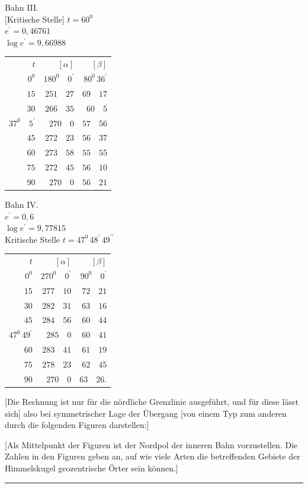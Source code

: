 \begin{center}
Bahn III.\\[3pt]
[Kritische Stelle] \(t=60^{0}\)\\
\(e^{\prime}=0{,}46761\)\\
\(\log e^{\prime}=9{,}66988\)\par\smallskip
\begin{tabular}{r@{\qquad}r@{\qquad}r}
\(t\)&\([\alpha]\)&\([\beta]\)\\[3pt]
\(0^{0}\)&\(180^{0}\quad0^{\prime}\)&\(80^{0}\,36^{\prime}\)\\
\(15\)&\(251\quad27\)&\(69\quad17\)\\
\(30\)&\(266\quad35\)&\(60\quad5\)\\
\(37^{0}\quad5^{\prime}\)&\(270\quad0\)&\(57\quad56\)\\
\(45\)&\(272\quad23\)&\(56\quad37\)\\
\(60\)&\(273\quad58\)&\(55\quad55\)\\
\(75\)&\(272\quad45\)&\(56\quad10\)\\
\(90\)&\(270\quad0\)&\(56\quad21\)
\end{tabular}
\end{center}
\begin{center}
Bahn IV.\\[3pt]
\(e^{\prime}=0{,}6\)\\
\(\log e^{\prime}=9{,}77815\)\\
Kritische Stelle \(t=47^{0}\,48^{\prime}\,49^{\prime\prime}\)\par\smallskip
\begin{tabular}{r@{\qquad}r@{\qquad}r}
\(t\)&\([\alpha]\)&\([\beta]\)\\[3pt]
\(0^{0}\)&\(270^{0}\quad0^{\prime}\)&\(90^{0}\quad0^{\prime}\)\\
\(15\)&\(277\quad10\)&\(72\quad21\)\\
\(30\)&\(282\quad31\)&\(63\quad16\)\\
\(45\)&\(284\quad56\)&\(60\quad44\)\\
\(47^{0}\,49^{\prime}\)&\(285\quad0\)&\(60\quad41\)\\
\(60\)&\(283\quad41\)&\(61\quad19\)\\
\(75\)&\(278\quad23\)&\(62\quad45\)\\
\(90\)&\(270\quad0\)&\(63\quad26.\)
\end{tabular}
\end{center}

[Die Rechnung ist nur für die nördliche Grenzlinie ausgeführt, und für diese lässt sich] also bei symmetrischer Lage der Übergang [von einem Typ zum anderen durch die folgenden Figuren darstellen:]

[Als Mittelpunkt der Figuren ist der Nordpol der inneren Bahn vorzustellen. Die Zahlen in den Figuren geben an, auf wie viele Arten die betreffenden Gebiete der Himmelskugel geozentrische Örter sein können.]
\begin{center}\rule{.22\textwidth}{.3pt}\end{center}
